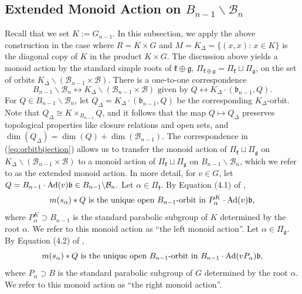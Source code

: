 \documentclass[12pt]{amsart}
\numberwithin{equation}{section}
\newcommand{\fk}{\mbox{${\mathfrak k}$}}
\newcommand{\fg}{\mbox{${\mathfrak g}$}}
\newcommand{\fb}{\mbox{${\mathfrak b}$}}
\newcommand{\Ad}{{\rm Ad}}
\newcommand{\B}{\mathcal{B}}
\newcommand{\Borbitspace}{B_{n-1}\backslash\B_{n}}
\begin{document}
\subsection{Extended Monoid Action on $\Borbitspace$}\label{ss:monoidactBn-1}
Recall that we set $K:=G_{n-1}$.  In this subsection, we apply the above construction in the case where $R=K\times G$ and $M=K_{\Delta}=\{(x,x):\, x\in K\}$ is the diagonal copy of $K$ in the product $K\times G$.  The discussion above yields a monoid action by the standard simple roots of $\fk\oplus\fg$, $\Pi_{\fk\oplus\fg}=\Pi_{\fk}\sqcup \Pi_{\fg}$, on the set of orbits $K_{\Delta}\backslash (\B_{n-1}\times \B).$  There is a one-to-one correspondence 
\begin{equation}\label{eq:orbitbijection}
\Borbitspace \leftrightarrow K_{\Delta}\backslash (\B_{n-1}\times \B) \mbox{ given by } Q\leftrightarrow K_{\Delta}\cdot (\fb_{n-1}, Q).
\end{equation} 
For $Q\in\Borbitspace$, let $Q_{\Delta} = K_{\Delta}\cdot (\fb_{n-1}, Q)$ be the corresponding $K_{\Delta}$-orbit.  Note that $Q_{\Delta} \cong K\times_{B_{n-1}} Q$, and it follows that the map $Q \mapsto Q_{\Delta}$
preserves topological properties like closure relations and open sets, and $\dim(Q_{\Delta})=\dim(Q) + \dim(\B_{n-1}).$   The correspondence in (\ref{eq:orbitbijection}) allows us to transfer the monoid action of $\Pi_{\fk} \sqcup \Pi_{\fg}$ on $K_{\Delta}\backslash (\B_{n-1}\times \B)$ to a monoid action of $\Pi_{\fk} \sqcup \Pi_{\fg}$ on $\Borbitspace$, which we refer to as the extended monoid action.  In more detail, for $v\in G$, let $Q=B_{n-1}\cdot\Ad(v)\fb \in\Borbitspace.$   Let $\alpha \in \Pi_{\fk}.$  By Equation (4.1) of \cite{CE21I}, 
\begin{equation}\label{eq:leftmonoid}
m(s_{\alpha})*Q \mbox{ is the unique open $B_{n-1}$-orbit in } P^{K}_{\alpha} \cdot \Ad(v)\fb,
\end{equation}
where $P^{K}_{\alpha}\supset B_{n-1}$ is the standard parabolic subgroup of $K$ determined by the root $\alpha$.  We refer to this monoid action as ``the left monoid action''.  Let $\alpha \in \Pi_{\fg}.$  By Equation (4.2) of \cite{CE21I}, 
\begin{equation}\label{eq:rightmonoid}
m(s_{\alpha})*Q\mbox{ is the unique open $B_{n-1}$-orbit in } 
B_{n-1} \cdot \Ad(vP_{\alpha})\fb,
\end{equation}
where $P_{\alpha}\supset B$ is the standard parabolic subgroup of $G$ determined by the root $\alpha$.   We refer to this monoid action as ``the right monoid action''.  
\end{document}
